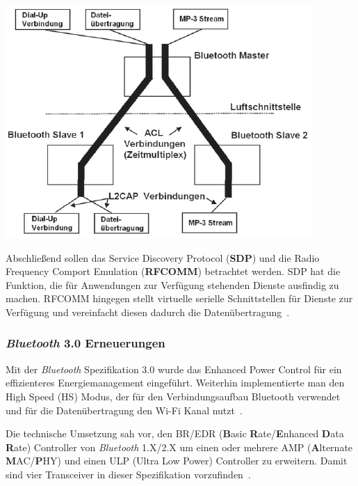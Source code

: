 \begin{multicols}{3}

\begin{Figure}
\includegraphics[width=\linewidth]{Kapitel/Bluetooth3.0/Grafiken/l2cap.png}
\label{fig:l2cap}
\end{Figure} 

\noindent
Abschließend sollen das Service Discovery Protocol (\textbf{SDP}) und die Radio Frequency Comport Emulation (\textbf{RFCOMM}) betrachtet werden. SDP hat die Funktion, die für Anwendungen zur Verfügung stehenden Dienste ausfindig zu machen. RFCOMM hingegen stellt virtuelle serielle Schnittstellen für Dienste zur Verfügung und vereinfacht diesen dadurch die Datenübertragung~\cite{bluetooth3.0.3}.

\subsubsection*{\textit{Bluetooth} 3.0 Erneuerungen}
Mit der \textit{Bluetooth} Spezifikation 3.0 wurde das Enhanced Power Control für ein effizienteres Energiemanagement eingeführt. Weiterhin implementierte man den High Speed (HS) Modus, der für den Verbindungsaufbau Bluetooth verwendet und für die Datenübertragung den Wi-Fi Kanal nutzt~\cite{bluetooth3.0.1}.

Die technische Umsetzung sah vor, den BR/EDR (\textbf{B}asic \textbf{R}ate/\textbf{E}nhanced \textbf{D}ata \textbf{R}ate) Controller von \textit{Bluetooth} 1.X/2.X um einen oder mehrere AMP (\textbf{A}lternate \textbf{M}AC/\textbf{P}HY) und einen ULP (Ultra Low Power) Controller zu erweitern. Damit sind vier Transceiver in dieser Spezifikation vorzufinden~\cite{bluetooth3.0.2}.


\end{multicols}
